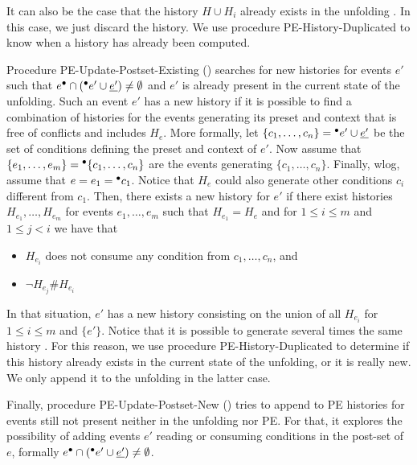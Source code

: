 \documentclass{article}
\newcommand{\pe}{{\sc PE}}
\newcommand{\peupdatepostexisting}{{\sc PE-Update-Postset-Existing}}
\newcommand{\peupdatepostnew}{{\sc PE-Update-Postset-New}}
\newcommand{\pehistdup}{{\sc PE-History-Duplicated}}
\begin{document}
It can also be the case that the history $H \cup H_i$ already exists in the
unfolding .  In this case, we just discard the
history.  We use procedure \pehistdup{} to know when a history has already been
computed.

Procedure \peupdatepostexisting{} () searches for
new histories for events $e'$ such that $e^\bullet \cap ({}^\bullet e' \cup
\underline{e'}) \neq \emptyset$ and $e'$ is already present in the current state of
the unfolding.  Such an event $e'$ has a new history if it is possible to find
a combination of histories for the events generating its preset and context
that is free of conflicts and includes $H_e$.  More formally, let $\{c_1,
\ldots, c_n\} = {}^\bullet e' \cup \underline{e'}$ be the set of conditions defining the
preset and context of $e'$.  Now assume that $\{e_1, \ldots, e_m\} =
{}^\bullet\{c_1, \ldots, c_n\}$ are the events generating $\{c_1, \ldots, c_n\}$.
Finally, wlog, assume that $e = e_1 = {}^\bullet c_1$.  Notice that $H_e$ could also
generate other conditions $c_i$ different from $c_1$.  Then, there exists a new
history for $e'$ if there exist histories $H_{e_1}, \ldots, H_{e_m}$ for events
$e_1, \ldots, e_m$ such that $H_{e_1} = H_e$ and for $1 \le i \le m$ and $1 \le
j < i$ we have that

\begin{itemize}
\item $H_{e_i}$ does not consume any condition from $c_1, \ldots, c_n$, and
\item $\lnot H_{e_j} \# H_{e_i}$
\end{itemize}

In that situation, $e'$ has a new history consisting on the union of all
$H_{e_i}$ for $1 \le i \le m$ and $\{e'\}$.  Notice that it is possible to
generate several times the same history .  For
this reason, we use procedure \pehistdup{} to determine if this history already
exists in the current state of the unfolding, or it is really new.  We only
append it to the unfolding in the latter case.

Finally, procedure \peupdatepostnew{} () tries to
append to \pe{} histories for events still not present neither in the unfolding
nor \pe{}.  For that, it explores the possibility of adding events $e'$ reading
or consuming conditions in the post-set of $e$, formally $e^\bullet \cap
({}^\bullet e' \cup \underline{e'}) \neq \emptyset$.

\end{document}
